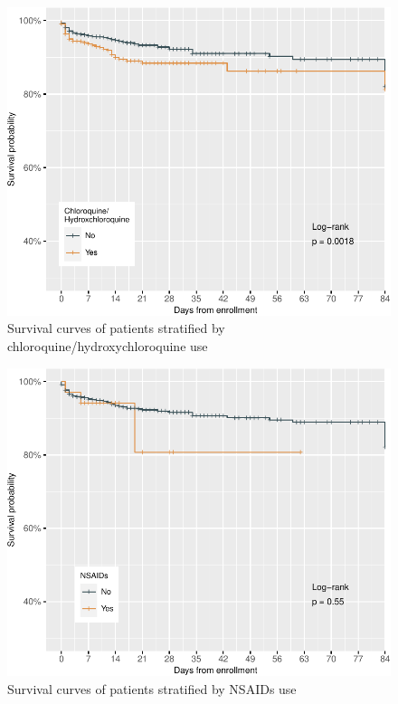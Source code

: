 \documentclass[
  10pt,
]{article}
\begin{document}
\newpage
\begin{figure}[h]

{\centering \includegraphics{results_files/figure-latex/chloroquine-1} 

}

\caption{Survival curves of patients stratified by chloroquine/hydroxychloroquine use}\label{fig:chloroquine}
\end{figure}

\newpage
\begin{figure}[h]

{\centering \includegraphics{results_files/figure-latex/nsaids-1} 

}

\caption{Survival curves of patients stratified by NSAIDs use}\label{fig:nsaids}
\end{figure}
\end{document}

